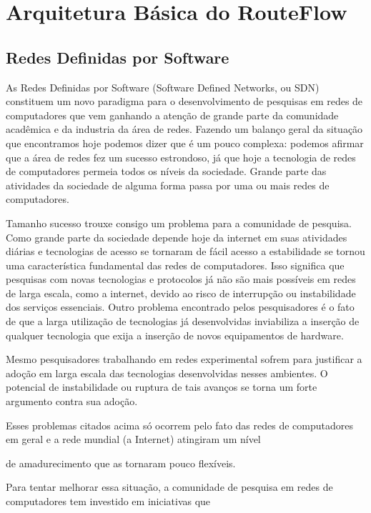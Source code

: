 \chapter{Arquitetura Básica do RouteFlow}

\section{Redes Definidas por Software}
As Redes Definidas por Software (Software 
Defined Networks, ou SDN) constituem um novo
paradigma para o desenvolvimento de pesquisas 
em redes de computadores que vem ganhando a 
atenção de 
grande parte da comunidade acadêmica e da 
industria da área de redes. Fazendo um 
balanço 
geral da 
situação que encontramos hoje podemos dizer 
que é um pouco complexa: podemos afirmar que 
a 
área de 
redes fez um sucesso estrondoso, já que hoje a 
tecnologia de redes de computadores permeia 
todos os níveis da 
sociedade. Grande parte das atividades da 
sociedade de alguma forma passa por uma ou 
mais redes de 
computadores. 

Tamanho sucesso trouxe consigo um problema 
para a comunidade de pesquisa. Como grande 
parte da sociedade depende hoje da internet em 
suas atividades diárias e tecnologias de 
acesso se 
tornaram de fácil acesso a estabilidade se 
tornou uma característica fundamental das 
redes de 
computadores. Isso significa que pesquisas com 
novas tecnologias e protocolos já não são 
mais 
possíveis 
em redes de larga escala, como a internet, 
devido ao risco de interrupção ou 
instabilidade dos serviços 
essenciais. Outro problema encontrado pelos 
pesquisadores é o fato de que a larga 
utilização de 
tecnologias já desenvolvidas inviabiliza a 
inserção de qualquer tecnologia que exija a 
inserção de 
novos equipamentos de hardware.

Mesmo pesquisadores trabalhando em redes 
experimental sofrem para justificar 
a adoção em larga escala das tecnologias 
desenvolvidas nesses ambientes. 
O potencial de instabilidade ou 
ruptura de tais avanços se torna um forte 
argumento contra sua adoção. 

Esses problemas citados acima só ocorrem pelo 
fato das redes de computadores em geral e a 
rede mundial (a Internet) atingiram um nível 

de amadurecimento que as tornaram pouco 
flexíveis.

Para tentar melhorar essa situação, a 
comunidade de pesquisa em redes de 
computadores tem investido em iniciativas que 

